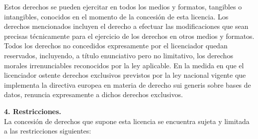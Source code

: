         \par Estos derechos se pueden ejercitar en todos los medios y formatos, tangibles o intangibles, conocidos en el momento de la concesión de esta licencia. Los derechos mencionados incluyen el derecho a efectuar las modificaciones que sean precisas técnicamente para el ejercicio de los derechos en otros medios y formatos. Todos los derechos no concedidos expresamente por el licenciador quedan reservados, incluyendo, a título enunciativo pero no limitativo, los derechos morales irrenunciables reconocidos por la ley aplicable. En la medida en que el licenciador ostente derechos exclusivos previstos por la ley nacional vigente que implementa la directiva europea en materia de derecho sui generis sobre bases de datos, renuncia expresamente a dichos derechos exclusivos.\\


        \par \textbf{4. Restricciones.}\\
	 La concesión de derechos que supone esta licencia se encuentra sujeta y limitada a las restricciones siguientes:

